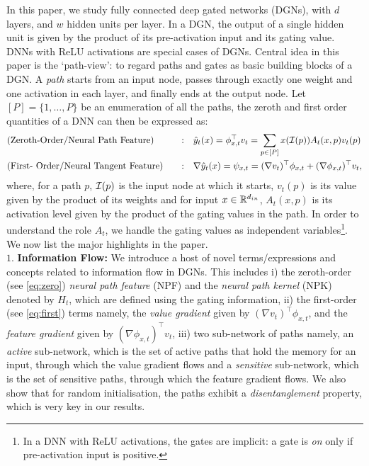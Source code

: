  In this paper, we study fully connected deep gated networks (DGNs), with $d$ layers, and $w$ hidden units per layer. In a DGN,  the output of a single hidden unit is given by the product of its pre-activation input and its gating value. DNNs with ReLU activations are special cases of DGNs. Central idea in this paper is the `path-view': to regard paths and gates as basic building blocks of a DGN. A \emph{path} starts from an input node, passes through exactly one weight and one activation in each layer, and finally ends at the output node. Let $[P]=\{1,\ldots,P\}$ be an enumeration of all the paths, the zeroth and first order quantities of a DNN can then be expressed as:
\begin{align}
\label{eq:zero}&\text{(Zeroth-Order/Neural Path Feature)}&\quad:& \quad \hat{y}_t(x)={\phi^\top_{x,t}} v_t=\sum_{p\in [P]}x(\mathcal{I}(p))A_t(x,p)v_t(p)\\
\label{eq:first}&\text{(First- Order/Neural Tangent Feature)}&\quad:&\quad   \nabla \hat{y}_t(x)=\psi_{x,t}=(\nabla v_t )^\top \phi_{x,t} + (\nabla \phi_{x,t})^\top v_t,
\end{align}
where, for a path $p$, $\mathcal{I}(p)$ is the input node at which it starts, $v_t(p)$ is its value given by the product of its weights and for input $x\in\mathbb{R}^{d_{in}}$, $A_t(x,p)$ is its activation level given by the product of the gating values in the path. In order to understand the role $A_t$, we handle the gating values as independent variables\footnote{In a DNN with ReLU activations, the gates are implicit: a gate is \emph{on} only if pre-activation input is positive.}. We now list the major highlights in the paper.\hfill\\
$1.$ \textbf{Information Flow:} We introduce a host of novel terms/expressions and concepts related to information flow in DGNs. This includes i) the zeroth-order (see \eqref{eq:zero}) \emph{neural path feature} (NPF) and the \emph{neural path kernel} (NPK) denoted by $H_t$, which are defined using the gating information, ii) the first-order (see \eqref{eq:first}) terms namely, the \emph{value gradient} given by $(\nabla v_t )^\top \phi_{x,t}$, and the \emph{feature gradient} given by $(\nabla \phi_{x,t})^\top v_t$, iii)  two sub-network of paths namely, an \emph{active} sub-network, which is the set of active paths that hold the memory for an input, through which the value gradient flows and a \emph{sensitive} sub-network, which is the set of sensitive paths, through which the feature gradient flows. We also show that for random initialisation, the paths exhibit a \emph{disentanglement} property, which is very key in our results.\\
